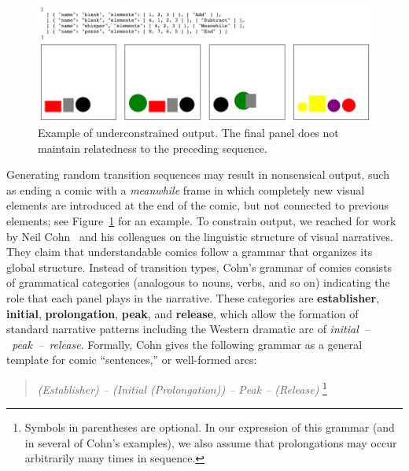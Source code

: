 \begin{figure}[b]
\centering
\includegraphics[width=0.8\columnwidth]{comicgen-underconstrained-2.png}
\caption{Example of underconstrained output. The final panel does not
maintain relatedness to the preceding sequence.}
\label{fig:outbad}
\end{figure}

Generating random transition sequences may result in nonsensical output,
such as ending a comic with a \emph{meanwhile} frame in which completely new
visual elements are introduced at the end of the comic, but not connected to 
previous elements; see Figure~\ref{fig:outbad} for an example. 
To constrain output, we reached for work by Neil Cohn~\cite{cohn2016visual}
and his colleagues on the linguistic structure of visual narratives. They
claim that understandable comics follow a grammar that organizes its global
structure. Instead of transition types, Cohn's grammar of comics consists
of grammatical categories (analogous to nouns, verbs, and so on) indicating
the role that each panel plays in the narrative. These categories are {\bf
establisher}, {\bf initial}, {\bf prolongation}, {\bf peak}, and {\bf
release}, which allow the formation of standard narrative patterns
including the Western dramatic arc of \hbox{\em initial -- peak --
release}. Formally, Cohn gives the following grammar as a general template
for comic ``sentences,'' or well-formed arcs:

\begin{quotation}
{\it (Establisher) -- (Initial (Prolongation)) -- Peak -- (Release)}
\footnote{Symbols in parentheses are optional. In our expression of this grammar (and
in several of Cohn's examples), we also assume that prolongations may occur
arbitrarily many times in sequence.}
\end{quotation}

